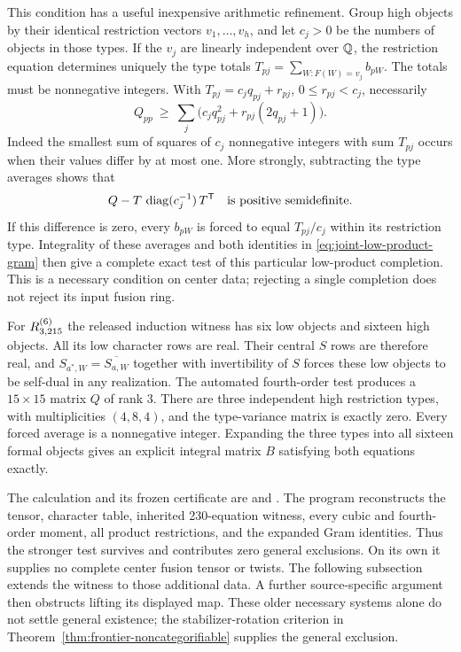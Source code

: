 This condition has a useful inexpensive arithmetic refinement. Group
high objects by their identical restriction vectors $v_1,\ldots,v_h$,
and let $c_j>0$ be the numbers of objects in those types. If the $v_j$
are linearly independent over $\mathbb Q$, the restriction equation determines
uniquely the type totals $T_{pj}=\sum_{W:F(W)=v_j}b_{pW}$. The totals
must be nonnegative integers. With $T_{pj}=c_jq_{pj}+r_{pj}$,
$0\leq r_{pj}<c_j$, necessarily
\begin{equation}\label{eq:integral-variance-bound}
 Q_{pp}\ \geq\ \sum_j\bigl(c_jq_{pj}^2+
                                  r_{pj}(2q_{pj}+1)\bigr).
\end{equation}
Indeed the smallest sum of squares of $c_j$ nonnegative integers with
sum $T_{pj}$ occurs when their values differ by at most one. More
strongly, subtracting the type averages shows that
\[
 Q-T\,\operatorname{diag}(c_j^{-1})\,T^{\mathsf T}
 \quad\hbox{is positive semidefinite}.
\]
If this difference is zero, every $b_{pW}$ is forced to equal
$T_{pj}/c_j$ within its restriction type. Integrality of these averages
and both identities in \eqref{eq:joint-low-product-gram} then give a
complete exact test of this particular low-product completion.
This is a necessary condition on center data; rejecting a single
completion does not reject its input fusion ring.

For $R^{(6)}_{3,215}$ the released induction witness has six low objects
and sixteen high objects. All its low character rows are real. Their
central $S$ rows are therefore real, and
$S_{a^*,W}=\overline{S_{a,W}}$ together with invertibility of $S$ forces
these low objects to be self-dual in any realization. The automated
fourth-order test produces a $15\times15$ matrix $Q$ of rank $3$.
There are three independent high restriction types, with multiplicities
$(4,8,4)$, and the type-variance matrix is exactly zero. Every forced
average is a nonnegative integer. Expanding the three types into all
sixteen formal objects gives an explicit integral matrix $B$ satisfying
both equations exactly.

The calculation and its frozen certificate are
 and
.
The program reconstructs the tensor, character table, inherited
230-equation witness, every cubic and fourth-order moment, all product
restrictions, and the expanded Gram identities. Thus the stronger test
survives and contributes zero general exclusions. On its own it supplies
no complete center fusion tensor or twists. The following subsection
extends the witness to those additional data. A further source-specific
argument then obstructs lifting its displayed map. These older necessary
systems alone do not settle general existence; the stabilizer-rotation
criterion in Theorem~\ref{thm:frontier-noncategorifiable} supplies the
general exclusion.




